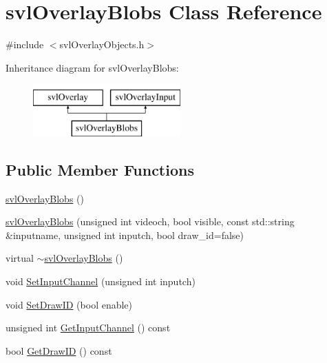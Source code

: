 \hypertarget{classsvl_overlay_blobs}{\section{svl\-Overlay\-Blobs Class Reference}
\label{classsvl_overlay_blobs}
}


{\ttfamily \#include $<$svl\-Overlay\-Objects.\-h$>$}

Inheritance diagram for svl\-Overlay\-Blobs\-:\begin{figure}[H]
\begin{center}
\leavevmode
\includegraphics[height=2.000000cm]{d6/de4/classsvl_overlay_blobs}
\end{center}
\end{figure}
\subsection*{Public Member Functions}
\begin{DoxyCompactItemize}
\item 
\hyperlink{classsvl_overlay_blobs_a7ae5a22458d855e89f08250aa8a697db}{svl\-Overlay\-Blobs} ()
\item 
\hyperlink{classsvl_overlay_blobs_ad7e963f2a5f86beec96a36a231b1067e}{svl\-Overlay\-Blobs} (unsigned int videoch, bool visible, const std\-::string \&inputname, unsigned int inputch, bool draw\-\_\-id=false)
\item 
virtual \hyperlink{classsvl_overlay_blobs_aa34522da64f014a52b50b83cc62c020a}{$\sim$svl\-Overlay\-Blobs} ()
\item 
void \hyperlink{classsvl_overlay_blobs_a74cd4c4798433de8f7689c9dd2549b3d}{Set\-Input\-Channel} (unsigned int inputch)
\item 
void \hyperlink{classsvl_overlay_blobs_af0ff36a3e91c5543a98d09d9eb33a87e}{Set\-Draw\-I\-D} (bool enable)
\item 
unsigned int \hyperlink{classsvl_overlay_blobs_a4c2ef413956516fbdca1ac03a01d962e}{Get\-Input\-Channel} () const 
\item 
bool \hyperlink{classsvl_overlay_blobs_af111ea8022890e4a4141c42521b66296}{Get\-Draw\-I\-D} () const 
\end{DoxyCompactItemize}
